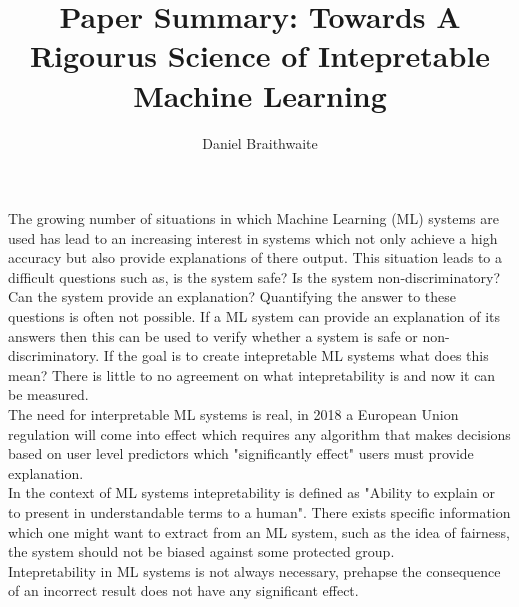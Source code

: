\documentclass{article}
\title{%
	Paper Summary: Towards A Rigourus Science of Intepretable Machine Learning
}
\author{Daniel Braithwaite}
\begin{document}
\maketitle

The growing number of situations in which Machine Learning (ML) systems are used has lead to an increasing interest in systems which not only achieve a high accuracy but also provide explanations of there output. This situation leads to a difficult questions such as, is the system safe? Is the system non-discriminatory? Can the system provide an explanation? Quantifying the answer to these questions is often not possible. If a ML system can provide an explanation of its answers then this can be used to verify whether a system is safe or non-discriminatory. If the goal is to create intepretable ML systems what does this mean? There is little to no agreement on what intepretability is and now it can be measured.\\

The need for interpretable ML systems is real, in 2018 a European Union regulation will come into effect which requires any algorithm that makes decisions based on user level predictors which "significantly effect" users must provide explanation.\\

In the context of ML systems intepretability is defined as "Ability to explain or to present in understandable terms to a human". There exists specific information which one might want to extract from an ML system, such as the idea of fairness, the system should not be biased against some protected group.\\

Intepretability in ML systems is not always necessary, prehapse the consequence of an incorrect result does not have any significant effect.
\end{document}
